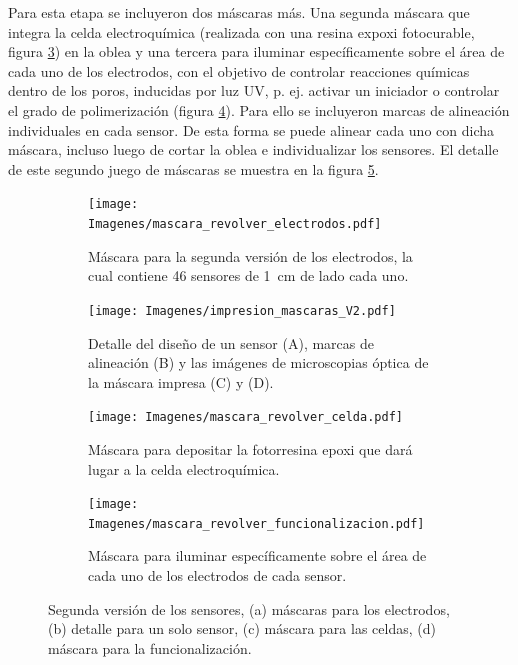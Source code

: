 {		     Para esta etapa se incluyeron dos máscaras más. Una segunda máscara que integra la celda electroquímica (realizada con una resina expoxi fotocurable, figura \ref{fig:mascara_su8}) en la oblea y una tercera para iluminar específicamente sobre el área de cada uno de los electrodos, con el objetivo de controlar reacciones químicas dentro de los poros, inducidas por luz UV, p. ej. activar un iniciador o controlar el grado de polimerización  (figura \ref{fig:mascara_funcionalizacion}).\cite{Andrieu-Brunsen2015,Herzog2015,Silies2015} Para ello se incluyeron marcas de alineación individuales en cada sensor. De esta forma se puede alinear cada uno con dicha máscara, incluso luego de cortar la oblea e individualizar los sensores. El detalle de este segundo juego de máscaras se muestra en la figura \ref{fig:impresion_diseno_V2}.
					\begin{figure}[th!]
			 	   	    \centering
			 	   	    \begin{subfigure}[t]{0.495\textwidth}
			        	\texttt{[image: Imagenes/mascara\_revolver\_electrodos.pdf]}
			       		\caption{Máscara para la segunda versión de los electrodos, la cual contiene 46 sensores de \SI{1}{cm} de lado cada uno.}
			         	\label{fig:mascara_v2}
			     		\end{subfigure}
			     		\begin{subfigure}[t]{0.495\textwidth}
			     		\texttt{[image: Imagenes/impresion\_mascaras\_V2.pdf]}
			    		\caption{Detalle del diseño de un sensor (A), marcas de alineación (B) y las imágenes de microscopias óptica de la máscara impresa (C) y (D).}
			    		\label{fig:impresion_diseno_v2_b}	
						\end{subfigure}
			     		\begin{subfigure}[t]{0.495\textwidth}
			         	\texttt{[image: Imagenes/mascara\_revolver\_celda.pdf]}
			        	\caption{Máscara para depositar la fotorresina epoxi que dará lugar a la celda electroquímica.}
			         	\label{fig:mascara_su8}
			     		\end{subfigure}
						\begin{subfigure}[t]{0.495\textwidth}
			     		\texttt{[image: Imagenes/mascara\_revolver\_funcionalizacion.pdf]}
			        	\caption{Máscara para iluminar específicamente sobre el área de cada uno de los electrodos de cada sensor.}
			         	\label{fig:mascara_funcionalizacion}
			     		\end{subfigure}
			     		\caption[Juego de máscara. Segunda versión]{Segunda versión de los sensores, (a) máscaras  para los electrodos, (b) detalle para un solo sensor, (c) máscara para las celdas, (d) máscara para la funcionalización.}
			     		\label{fig:impresion_diseno_V2}
			     	   	\end{figure}
	
}
